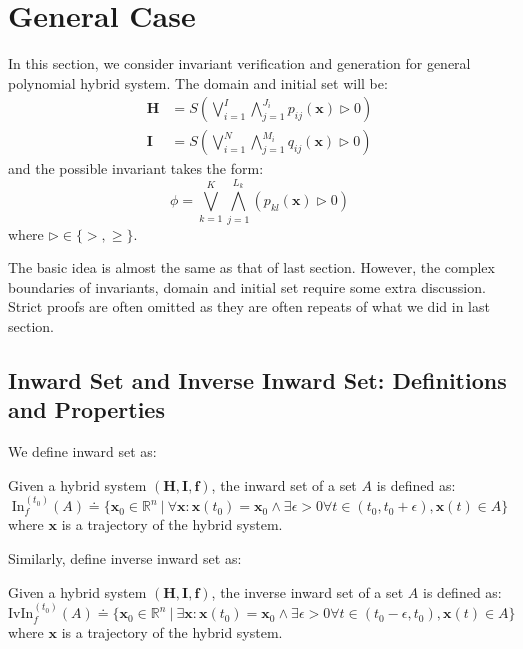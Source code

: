 \documentclass{jssc}
\begin{document}
\section{General Case}
\label{sec:general}
In this section, we consider invariant verification and generation for general polynomial hybrid system. The domain and initial set will be:
\begin{align*}
	\boldsymbol{H} &= S(\bigvee_{i=1}^I \bigwedge_{j=1}^{J_i} p_{ij}(\boldsymbol{x}) \rhd 0) \\
	\boldsymbol{I} &= S(\bigvee_{i=1}^N \bigwedge_{j=1}^{M_i} q_{ij}(\boldsymbol{x}) \rhd 0)
\end{align*}
and the possible invariant takes the form:
\begin{equation*}
	\phi = \bigvee_{k=1}^K \bigwedge_{j=1}^{L_k} (p_{kl}(\boldsymbol{x}) \rhd 0)
\end{equation*}
where $\rhd \in \{ >, \geq \}$.

The basic idea is almost the same as that of last section. However, the complex boundaries of invariants, domain and initial set require some extra discussion. Strict proofs are often omitted as they are often repeats of what we did in last section.

\subsection{Inward Set and Inverse Inward Set: Definitions and Properties}
We define inward set as:
\begin{definition}
\label{def:in}
Given a hybrid system $(\boldsymbol{H}, \boldsymbol{I}, \boldsymbol{f})$, the inward set of a set $A$ is defined as:
\begin{equation*}
	\mathrm{In}_f^{(t_0)}(A) \doteq \{ \boldsymbol{x}_0 \in \mathbb{R}^n\ |\ \forall \boldsymbol{x}: \boldsymbol{x}(t_0) = \boldsymbol{x}_0 \wedge \exists \epsilon > 0 \forall t \in (t_0, t_0 + \epsilon), \boldsymbol{x}(t) \in A \}
\end{equation*}
where $\boldsymbol{x}$ is a trajectory of the hybrid system.
\end{definition}

Similarly, define inverse inward set as:
\begin{definition}
\label{def:ivin}
Given a hybrid system $(\boldsymbol{H}, \boldsymbol{I}, \boldsymbol{f})$, the inverse inward set of a set $A$ is defined as:
\begin{equation*}
	\mathrm{IvIn}_f^{(t_0)}(A) \doteq \{ \boldsymbol{x}_0 \in \mathbb{R}^n\ |\ \exists \boldsymbol{x}: \boldsymbol{x}(t_0) = \boldsymbol{x}_0 \wedge \exists \epsilon > 0 \forall t \in (t_0 - \epsilon, t_0), \boldsymbol{x}(t) \in A \}
\end{equation*}
where $\boldsymbol{x}$ is a trajectory of the hybrid system.
\end{definition}
\end{document}
